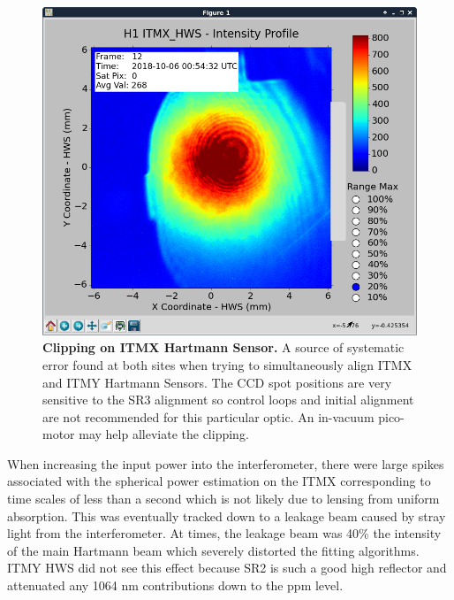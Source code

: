 	
	\begin{figure}[t!]
		\centering
		\includegraphics[width=0.4\textheight]{../Figures/ITMX_HWS_clipping.png}
		\caption[Clipping on ITMX Hartmann Sensor.] 
		{\textbf{Clipping on ITMX Hartmann Sensor.}  A source of systematic error found at both sites when trying to simultaneously align ITMX and ITMY Hartmann Sensors.  The CCD spot positions are very sensitive to the SR3 alignment so control loops and initial alignment are not recommended for this particular optic.  An in-vacuum pico-motor may help alleviate the clipping.
		}
		\label{fig:ITMX_clipping}
	\end{figure}
	
	When increasing the input power into the interferometer, there were large spikes associated with the spherical power estimation on the ITMX corresponding to time scales of less than a second which is not likely due to lensing from uniform absorption.  This was eventually tracked down to a leakage beam caused by stray light from the interferometer.  At times, the leakage beam was 40\% the intensity of the main Hartmann beam which severely distorted the fitting algorithms. ITMY HWS did not see this effect because SR2 is such a good high reflector and attenuated any 1064 nm contributions down to the ppm level.
	

